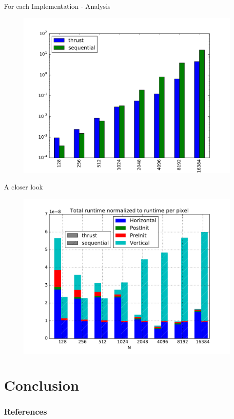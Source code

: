 \documentclass{beamer}
\begin{document}
\begin{frame}{For each Implementation - Analysis}
  \begin{figure}
    \includegraphics[scale=0.4]{imgs/thrust_vs_sequential_total.pdf} 
  \end{figure}
\end{frame} 

\begin{frame}{A closer look}
  \begin{figure}
    \includegraphics[scale=0.4]{imgs/thrust_vs_sequential_normalized.pdf} 
  \end{figure}
\end{frame} 


\section{Conclusion} 

\begin{frame}[t]
  \frametitle{References}
  
  
\end{frame}
\end{document}
